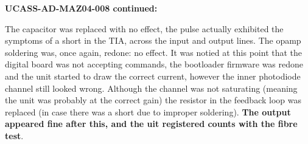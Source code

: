 

\textbf{UCASS-AD-MAZ04-008 continued:}

The capacitor was replaced with no effect, the pulse actually exhibited the symptoms of a short in the TIA, across the input and output lines. The opamp soldering was, once again, redone: no effect. It was notied at this point that the digital board was not accepting commands, the bootloader firmware was redone and the unit started to draw the correct current, however the inner photodiode channel still looked wrong. Although the channel was not saturating (meaning the unit was probably at the correct gain) the resistor in the feedback loop was replaced (in case there was a short due to improper soldering). \textbf{The output appeared fine after this, and the uit registered counts with the fibre test}.
